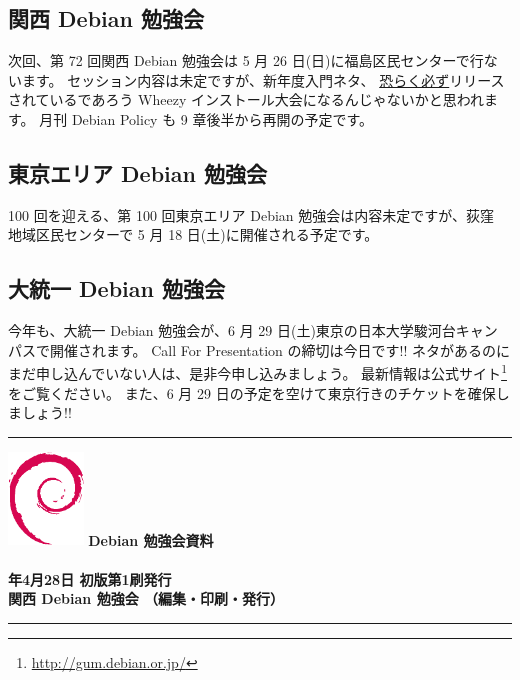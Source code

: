 \documentclass[mingoth,a4paper]{jsarticle}
\newcommand{\debmtgyear}{2013}
\newcommand{\debmtgdate}{28}
\newcommand{\debmtgmonth}{4}
\begin{document}


\subsection{関西 Debian 勉強会}

次回、第 72 回関西 Debian 勉強会は 5 月 26 日(日)に福島区民センターで行な
います。
セッション内容は未定ですが、新年度入門ネタ、
\underline{恐らく必ず}リリースされているであろう
Wheezy インストール大会になるんじゃないかと思われます。
月刊 Debian Policy も 9 章後半から再開の予定です。

\subsection{東京エリア Debian 勉強会}

100 回を迎える、第 100 回東京エリア Debian 勉強会は内容未定ですが、荻窪
地域区民センターで 5 月 18 日(土)に開催される予定です。

\subsection{大統一 Debian 勉強会}
今年も、大統一 Debian 勉強会が、6 月 29 日(土)東京の日本大学駿河台キャン
パスで開催されます。
%
Call For Presentation の締切は今日です!!
ネタがあるのにまだ申し込んでいない人は、是非今申し込みましょう。
%
最新情報は公式サイト\footnote{\url{http://gum.debian.or.jp/}}
をご覧ください。
%
また、6 月 29 日の予定を空けて東京行きのチケットを確保しましょう!!


 \mbox{}\newpage

\printindex

 \begin{minipage}[b]{0.2\hsize}
 \end{minipage}
 \begin{minipage}[b]{0.8\hsize}

 \vspace*{15cm}
 \rule{\hsize}{1mm}
 \vspace{2mm}
 \includegraphics[width=2cm]{image200502/openlogo-nd.eps}
 \noindent \Large \bf Debian 勉強会資料\\ \\
 \noindent \normalfont \debmtgyear{}年\debmtgmonth{}月\debmtgdate{}日 \hspace{5mm}  初版第1刷発行\\
 \noindent \normalfont 関西 Debian 勉強会 （編集・印刷・発行）\\
 \rule{\hsize}{1mm}
 \end{minipage}
\end{document}
